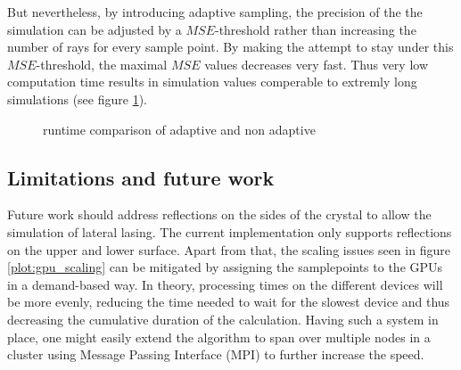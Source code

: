 But nevertheless, by introducing adaptive sampling, the precision of the the simulation
can be adjusted by a $MSE$-threshold rather than increasing the number
of rays for every sample point. By making the attempt to stay under this $MSE$-threshold,
the maximal $MSE$ values decreases very fast. Thus very low computation time results in
simulation values comperable to extremly long simulations (see figure \ref{plot:adaptive_runtime}).
\begin{figure}[H]
  \centerline{
    }
  \caption{runtime comparison of adaptive and non adaptive }
  \label{plot:adaptive_runtime}
\end{figure}

\subsection{Limitations and future work}
\label{subsec:limitations}
Future work should address reflections on the sides of the crystal to allow the
simulation of lateral lasing. The current implementation only supports
reflections on the upper and lower surface.
Apart from that, the scaling issues seen in figure \ref{plot:gpu_scaling} can be
mitigated by assigning the samplepoints to the GPUs in a demand-based way.  In
theory, processing times on the different devices will be more evenly, reducing
the time needed to wait for the slowest device and thus decreasing the
cumulative duration of the calculation. Having such a system in place, one might
easily extend the algorithm to span over multiple nodes in a cluster using
Message Passing Interface (MPI)\cite{MPI} to further increase the speed.
